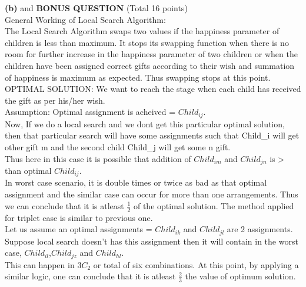 \documentclass[11pt]{article}
\renewcommand\part[1]{\vspace{.10in}\textbf{(#1)}}
\begin{document}
\part{b} and \textbf{BONUS QUESTION} (Total 16 points)\\
General Working of Local Search Algorithm:\\
The Local Search Algorithm swaps two values if the happiness parameter of children is less than maximum. It stops its swapping function when there is no room for further increase in the happiness parameter of two children or when the children have been assigned correct gifts according to their wish and summation of happiness is maximum as expected. Thus swapping stops at this point.
\\OPTIMAL SOLUTION: We want to reach the stage when each child has received the gift as per his/her wish.
\\Assumption: Optimal assignment is acheived = $Child_{ij}$. 
\\ Now, If we do a local search and we dont get this particular optimal solution, then that particular search will have some assignments such that Child\_i will get other gift m and the second child Child\_j will get some n gift.\\ Thus here in this case it is possible that addition of $Child_{im}$ and $Child_{jn}$ is > than optimal $Child_{ij}$.\\ In worst case scenario, it is double times or twice as bad as that optimal assignment and the similar case can occur for more than one arrangements. Thus we can conclude that it is atleast $\frac{1}{2}$ of the optimal solution.   
The method applied for triplet case is similar to previous one.\\
Let us assume an optimal assignments = $Child_{ik}$ and $Child_{jl}$ are 2 assignments. Suppose local search doesn't has this assignment then it will contain in the worst case, $Child_{il}$,$Child_{jz}$ and $Child_{hl}$.\\ This can happen in $3C_2$ or total of six combinations.
At this point, by applying a similar logic, one can conclude that it is atleast $\frac{2}{3}$ the value of optimum solution.
\end{document}

